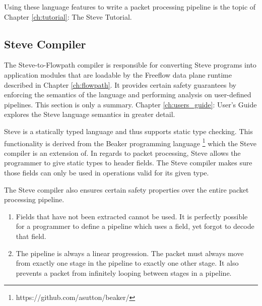 Using these language features to write a packet processing pipeline is the topic of Chapter \ref{ch:tutorial}: The Steve Tutorial.

\subsection{Steve Compiler}

The Steve-to-Flowpath compiler is responsible for converting Steve programs into application modules that are loadable by the Freeflow data plane runtime \cite{freeflow_software} described in Chapter \ref{ch:flowpath}. It provides certain safety guarantees by enforcing the semantics of the language and performing analysis on user-defined pipelines. This section is only a summary. Chapter \ref{ch:users_guide}: User's Guide explores the Steve language semantics in greater detail.

Steve is a statically typed language and thus supports static type checking. This functionality is derived from the Beaker programming language \footnote{https://github.com/asutton/beaker/} which the Steve compiler is an extension of. In regards to packet processing, Steve allows the programmer to give static types to header fields. The Steve compiler makes sure those fields can only be used in operations valid for its given type.

The Steve compiler also ensures certain safety properties over the entire packet processing pipeline.

\begin{enumerate}
\item Fields that have not been extracted cannot be used. It is perfectly possible for a programmer to define a pipeline which uses a field, yet forgot to decode that field.

\item The pipeline is always a linear progression. The packet must always move from exactly one stage in the pipeline to exactly one other stage. It also prevents a packet from infinitely looping between stages in a pipeline.
\end{enumerate}
